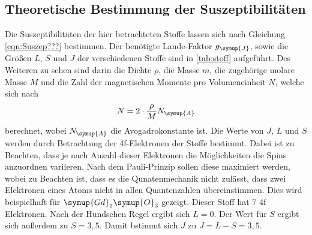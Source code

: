    \subsection{Theoretische Bestimmung der Suszeptibilitäten}
    Die Suszeptibilitäten der hier betrachteten Stoffe lassen sich nach Gleichung \eqref{eqn:Suszep???} bestimmen.
    Der benötigte Lande-Faktor $g_{\symup{J}}$, sowie die Größen $L$, $S$ und $J$ der verschiedenen Stoffe sind in \autoref{tab:stoff}
    aufgeführt. Des Weiteren zu sehen sind darin die Dichte $\rho$, die Masse $m$, die zugehörige molare Masse $M$ und die Zahl der magnetischen
    Momente pro Volumeneinheit $N$, welche sich nach 
    \begin{equation}
    \label{eqn:N}
        N = 2 \cdot \frac{\rho}{M} N_{\symup{A}}
    \end{equation}
    berechnet, wobei $N_{\symup{A}}$ die Avogadrokonstante ist. Die Werte von $J$, $L$ und $S$ werden durch Betrachtung der 4f-Elektronen 
    der Stoffe bestimmt. Dabei ist zu Beachten, dass je nach Anzahl dieser Elektronen die Möglichkeiten die Spins anzuordnen variieren.
    Nach dem Pauli-Prinzip sollen diese maximiert werden, wobei zu Beachten ist, dass es die Qunatenmechanik nicht zulässt, dass zwei 
    Elektronen eines Atoms nicht in allen Quantenzahlen übereinstimmen. Dies wird beispielhaft für $\symup{Gd}_2\symup{O}_3$ gezeigt.
    Dieser Stoff hat 7 4f Elektronen. Nach der Hundschen Regel ergibt sich $L = 0$. Der Wert für $S$ ergibt sich außerdem zu 
    $S = 3,5$. Damit bstimmt sich $J$ zu $J = L - S = 3,5$. 